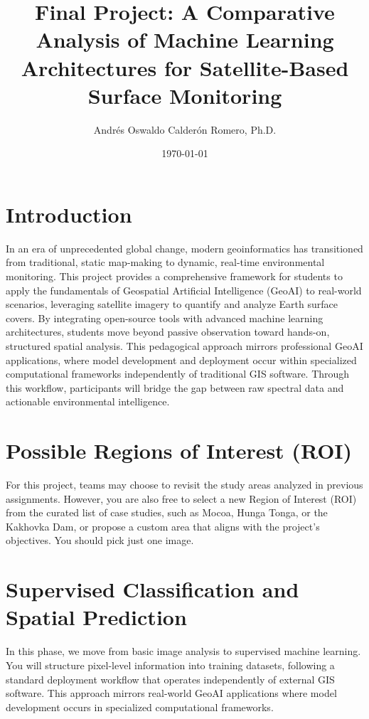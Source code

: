 \documentclass{article}
\title{Final Project: A Comparative Analysis of Machine Learning Architectures for Satellite-Based Surface Monitoring}
\author{Andrés Oswaldo Calderón Romero, Ph.D.}
\date{\today}
\begin{document}
\maketitle

\section{Introduction}
In an era of unprecedented global change, modern geoinformatics has transitioned from traditional, static map-making to dynamic, real-time environmental monitoring. This project provides a comprehensive framework for students to apply the fundamentals of Geospatial Artificial Intelligence (GeoAI) to real-world scenarios, leveraging satellite imagery to quantify and analyze Earth surface covers.  By integrating open-source tools with advanced machine learning architectures, students move beyond passive observation toward hands-on, structured spatial analysis. This pedagogical approach mirrors professional GeoAI applications, where model development and deployment occur within specialized computational frameworks independently of traditional GIS software. Through this workflow, participants will bridge the gap between raw spectral data and actionable environmental intelligence.

\section{Possible Regions of Interest (ROI)}
For this project, teams may choose to revisit the study areas analyzed in previous assignments. However, you are also free to select a new Region of Interest (ROI) from the curated list of case studies, such as Mocoa, Hunga Tonga, or the Kakhovka Dam, or propose a custom area that aligns with the project’s objectives.  You should pick just one image.

\section{Supervised Classification and Spatial Prediction}
In this phase, we move from basic image analysis to supervised machine learning. You will structure pixel-level information into training datasets, following a standard deployment workflow that operates independently of external GIS software. This approach mirrors real-world GeoAI applications where model development occurs in specialized computational frameworks.
\end{document}
